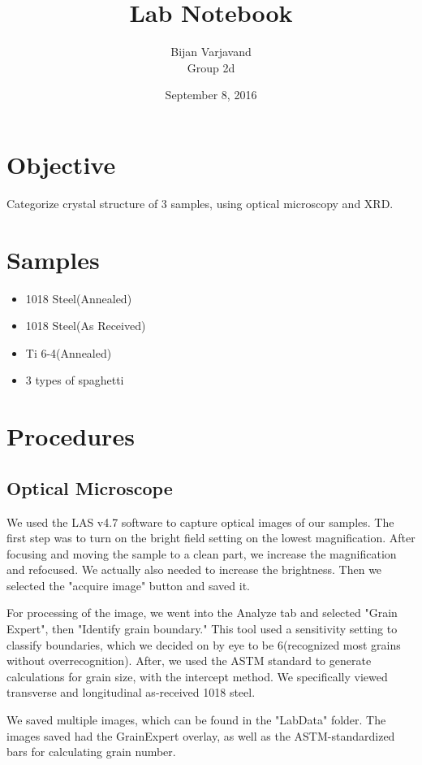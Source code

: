 \documentclass{article}
\author{Bijan Varjavand\\Group 2d}
\title{Lab Notebook}
\date{September 8, 2016}
\begin{document}
\maketitle

\section{Objective}
Categorize crystal structure of 3 samples, using optical microscopy and XRD.

\section{Samples}
\begin{itemize}
 \item 1018 Steel(Annealed)
 \item 1018 Steel(As Received)
 \item Ti 6-4(Annealed)
 \item 3 types of spaghetti
\end{itemize}

\section{Procedures}

\subsection{Optical Microscope}
We used the LAS v4.7 software to capture optical images of our samples. The first step was to turn on the bright field setting on the lowest magnification. After focusing and moving the sample to a clean part, we increase the magnification and refocused. We actually also needed to increase the brightness. Then we selected the "acquire image" button and saved it.

For processing of the image, we went into the Analyze tab and selected "Grain Expert", then "Identify grain boundary." This tool used a sensitivity setting to classify boundaries, which we decided on by eye to be 6(recognized most grains without overrecognition). After, we used the ASTM standard to generate calculations for grain size, with the intercept method. We specifically viewed transverse and longitudinal as-received 1018 steel. 

We saved multiple images, which can be found in the "LabData" folder. The images saved had the GrainExpert overlay, as well as the ASTM-standardized bars for calculating grain number.
\end{document}

